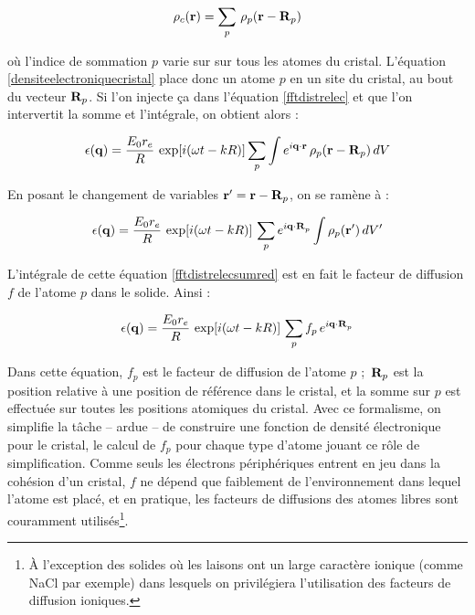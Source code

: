\begin{equation}
    \rho_c(\mathbf{r}) = \sum_p \, \rho_p(\mathbf{r - R}_p)
    \label{densiteelectroniquecristal}
\end{equation}

où l'indice de sommation $p$ varie sur sur tous les atomes du cristal. L'équation
\ref{densiteelectroniquecristal} place donc un atome $p$ en un site du cristal, au
bout du vecteur $\mathbf{R}_p$. Si l'on injecte ça dans l'équation \ref{fftdistrelec}
et que l'on intervertit la somme et l'intégrale, on obtient alors :

\begin{equation}
   \epsilon(\mathbf{q}) = \frac{E_0 r_e}{R}\, \exp [i(\omega t - k R)]
   \sum_p \int e^{i \mathbf{q \cdot r}}\, \rho_p (\mathbf{r - R}_p)\, dV
    \label{fftdistrelecsum}
\end{equation}

En posant le changement de variables $\mathbf{r' = r - R}_p$, on se ramène
à :

\begin{equation}
    \epsilon(\mathbf{q}) = \frac{E_0 r_e}{R}\, \exp [i(\omega t - k R)]\,
    \sum_p e^{i\mathbf{q \cdot R}_p} \int  \rho_p (\mathbf{r'})\, dV'
    \label{fftdistrelecsumred}
\end{equation}

L'intégrale de cette équation \ref{fftdistrelecsumred} est en fait le facteur de diffusion $f$ de l'atome $p$ dans le solide. Ainsi :


\begin{equation}
   \epsilon(\mathbf{q}) = \frac{E_0 r_e}{R}\, \exp [i(\omega t - k R)]\, \sum_p  f_p\, e^{i \mathbf{q \cdot R}_p}
    \label{fftdistrelecsumf}
\end{equation}

Dans cette équation, $f_p$ est le facteur de diffusion de l'atome $p$ ; $\mathbf{R}_p$ est la position relative à une position de référence dans le
cristal, et la somme sur $p$ est effectuée sur toutes les positions atomiques du
cristal. Avec ce formalisme, on simplifie la tâche -- ardue -- de construire une
fonction de densité électronique pour le cristal, le calcul de $f_p$ pour chaque type d'atome jouant ce rôle de simplification.
Comme seuls les électrons périphériques entrent en jeu dans la cohésion d'un
cristal, $f$ ne dépend que faiblement de l'environnement dans lequel l'atome est
placé, et en pratique, les facteurs de diffusions des atomes libres sont
couramment utilisés\footnote{À l'exception des solides où les laisons ont un
    large caractère ionique (comme NaCl par exemple) dans lesquels on privilégiera l'utilisation des facteurs de diffusion ioniques.}.

